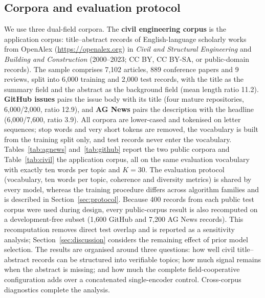 \documentclass[pdflatex,sn-basic]{sn-jnl}
\begin{document}
\subsection{Corpora and evaluation protocol}
We use three dual-field corpora. The \textbf{civil engineering corpus} is the application corpus:
title--abstract records of English-language scholarly works from OpenAlex \cite{openalex2022}
(\url{https://openalex.org}) in \emph{Civil and Structural Engineering} and \emph{Building and
Construction} (2000--2023; CC BY, CC BY-SA, or public-domain records). The sample comprises
7,102 articles, 889 conference papers and 9 reviews, split into 6,000 training and 2,000 test
records, with the title as the summary field and the abstract as the background field (mean
length ratio 11.2). \textbf{GitHub issues} \cite{openindex2026} pairs the issue body with its
title (four mature repositories, 6,000/2,000, ratio 12.9), and \textbf{AG News} \cite{zhang2015char}
pairs the description with the headline (6,000/7,600, ratio 3.9). All corpora are lower-cased and
tokenised on letter sequences; stop words and very short tokens are removed, the vocabulary is
built from the training split only, and test records never enter the vocabulary.
Tables~\ref{tab:agnews} and~\ref{tab:github} report the two public corpora and Table~\ref{tab:civil} the application corpus, all on the same evaluation vocabulary with exactly ten
words per topic and $K=30$. The evaluation protocol (vocabulary, ten words per topic, coherence
and diversity metrics) is shared by every model, whereas the training procedure differs across
algorithm families and is described in Section~\ref{sec:protocol}.
Because 400 records from each public test corpus were used during design, every public-corpus
result is also recomputed on a development-free subset (1,600 GitHub and 7,200 AG News records).
This recomputation removes direct test overlap and is reported as a sensitivity analysis;
Section~\ref{sec:discussion} considers the remaining effect of prior model selection. The results
are organised around three questions: how well civil title--abstract records can be structured
into verifiable topics; how much signal remains when the abstract is missing; and how much the
complete field-cooperative configuration adds over a concatenated single-encoder control.
Cross-corpus diagnostics complete the analysis.
\end{document}
